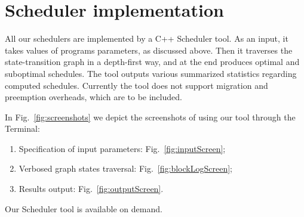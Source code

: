 \section{Scheduler implementation}
\label{sec:scheduler_tool}

All our schedulers are implemented by a C++ Scheduler tool. As an input, it takes values of programs parameters, as discussed above. Then it traverses the state-transition graph in a depth-first way, and at the end produces optimal and suboptimal schedules. The tool outputs various summarized statistics regarding computed schedules. Currently the tool does not support migration and preemption overheads, which are to be included.

In Fig.~\ref{fig:screenshots} we depict the screenshots of using our tool through the Terminal:
%
\begin{enumerate}
\item Specification of input parameters: Fig.~\ref{fig:inputScreen};
\item Verbosed graph states traversal: Fig.~\ref{fig:blockLogScreen};
\item Results output: Fig.~\ref{fig:outputScreen}.
\end{enumerate}

Our Scheduler tool is available on demand.

